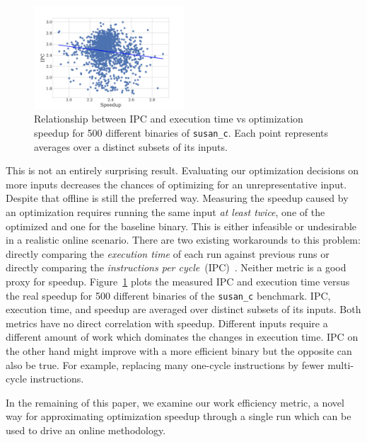 \begin{figure}[t]
    \centering
    \includegraphics[width=0.5\textwidth]{figs/motivation-metric.pdf}
    \caption{Relationship between IPC and execution time vs optimization speedup for 500 different binaries of \texttt{susan\_c}. Each point represents
	averages over a distinct subsets of its inputs.}
    \label{fig:motivation-metric}
\end{figure}

This is not an entirely surprising result. Evaluating our optimization decisions on more inputs decreases the chances of optimizing for an
unrepresentative input. Despite that offline \itercomp is still the preferred way. Measuring the speedup caused by an optimization requires
running the same input \textit{at least twice}, one of the optimized and one for the baseline binary. This is either infeasible or
undesirable in a realistic online \itercomp scenario. There are two existing workarounds to this problem: directly comparing the
\textit{execution time} of each run against previous runs or directly comparing the \textit{instructions per cycle}~(IPC)~\citep{fursin07}.
Neither metric is a good proxy for speedup. Figure~\ref{fig:motivation-metric} plots the measured IPC and execution time versus the real
speedup for 500 different binaries of the \texttt{susan\_c} benchmark. IPC, execution time, and speedup are averaged over distinct subsets of its inputs.
Both metrics have no direct correlation with speedup. Different inputs require a different amount of work which dominates the changes in execution time. IPC on
the other hand might improve with a more efficient binary but the opposite can also be true. For example,
replacing many one-cycle instructions by fewer multi-cycle instructions.

In the remaining of this paper, we examine our work efficiency metric, a novel way for approximating optimization speedup through a single
run which can be used to drive an online \itercomp methodology.

